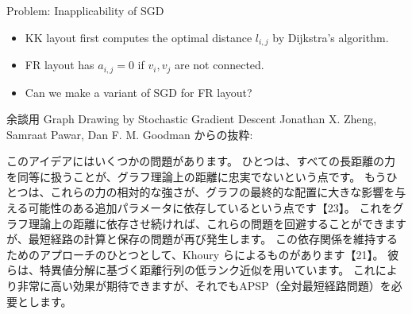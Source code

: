 \documentclass[13pt,aspectratio=169,table,dvipdfmx]{beamer}
\begin{document}
\begin{frame}{Problem: Inapplicability of SGD}
\begin{figure}[htbp]
        \end{figure}
        \begin{itemize}
            \item KK layout first computes the optimal distance $l_{i,j}$ by Dijkstra's algorithm.
            \item FR layout has $a_{i,j}=0$ if $v_i,v_j$ are not connected.
            \item Can we make a variant of SGD for FR layout?
        \end{itemize}
    \end{frame}
    \begin{frame}{余談用}
        Graph Drawing by Stochastic Gradient Descent
        Jonathan X. Zheng, Samraat Pawar, Dan F. M. Goodman
        からの抜粋:

        \begin{center}
        \end{center}

        このアイデアにはいくつかの問題があります。
        ひとつは、すべての長距離の力を同等に扱うことが、グラフ理論上の距離に忠実でないという点です。
        もうひとつは、これらの力の相対的な強さが、グラフの最終的な配置に大きな影響を与える可能性のある追加パラメータに依存しているという点です【23】。
        これをグラフ理論上の距離に依存させ続ければ、これらの問題を回避することができますが、最短経路の計算と保存の問題が再び発生します。
        この依存関係を維持するためのアプローチのひとつとして、Khoury らによるものがあります【21】。
        彼らは、特異値分解に基づく距離行列の低ランク近似を用いています。
        これにより非常に高い効果が期待できますが、それでもAPSP（全対最短経路問題）を必要とします。
    \end{frame}
\fi
\end{document}
